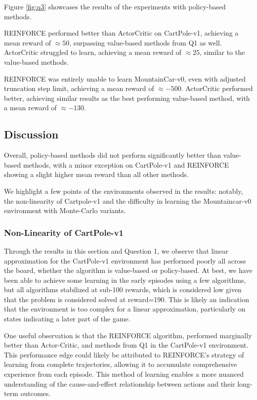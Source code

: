 \documentclass{article}
\begin{document}
Figure \ref{fig:q3} showcases the results of the experiments with policy-based methods.

REINFORCE performed better than ActorCritic on CartPole-v1, achieving a mean reward of $\approx 50$, surpassing
value-based methods from Q1 as well. ActorCritic struggled to learn, achieving a mean reward of $\approx 25$,
similar to the value-based methods.

REINFORCE was entirely unable to learn MountainCar-v0, even with adjusted truncation step limit,
achieving a mean reward of $\approx -500$. ActorCritic performed better, achieving similar
results as the best performing value-based method, with a mean reward of $\approx -130$.

\subsection{Discussion}
Overall, policy-based methods did not perform significantly better than value-based methods,
with a minor exception on CartPole-v1 and REINFORCE showing a slight higher mean reward than
all other methods.

We highlight a few points of the environments observed in the results: notably, the non-linearity of
Cartpole-v1 and the difficulty in learning the Mountaincar-v0 environment with Monte-Carlo variants.

\subsubsection{Non-Linearity of CartPole-v1}

Through the results in this section and Question 1, we observe that linear approximation
for the CartPole-v1 environment has performed poorly all across the board, whether the algorithm
is value-based or policy-based. At best, we have been
able to achieve some learning in the early episodes using a few algorithms, but all algorithms
stabilized at sub-100 rewards, which is considered low given that the problem is considered solved at reward=190\cite{gym}.
This is likely an indication that the environment is too complex for a linear
approximation, particularly on states indicating a later part of the game.

One useful observation is that the REINFORCE algorithm, performed marginally better
than Actor-Critic, and methods from Q1 in the CartPole-v1 environment.
This performance edge could likely be attributed to REINFORCE's strategy of learning from complete trajectories,
allowing it to accumulate comprehensive experience from each episode.
This method of learning enables a more nuanced understanding of the cause-and-effect
relationship between actions and their long-term outcomes.
\end{document}
